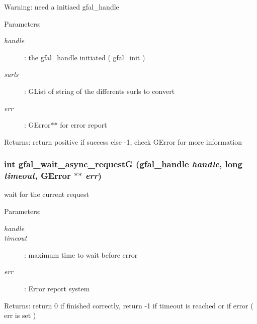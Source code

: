 \begin{Desc}
\item[Warning:]need a initiaed gfal\_\-handle \end{Desc}
\begin{Desc}
\item[Parameters:]
\begin{description}
\item[{\em handle}]: the gfal\_\-handle initiated ( gfal\_\-init ) \item[{\em surls}]: GList of string of the differents surls to convert \item[{\em err}]: GError$\ast$$\ast$ for error report \end{description}
\end{Desc}
\begin{Desc}
\item[Returns:]return positive if success else -1, check GError for more information \end{Desc}
\subsubsection{\setlength{\rightskip}{0pt plus 5cm}int gfal\_\-wait\_\-async\_\-request\-G (gfal\_\-handle {\em handle}, long {\em timeout}, GError $\ast$$\ast$ {\em err})}\label{gfal__common__srm_8h_86890a00f72d9af9ab88f42a69e3bf8c}


wait for the current request 

\begin{Desc}
\item[Parameters:]
\begin{description}
\item[{\em handle}]\item[{\em timeout}]: maximum time to wait before error \item[{\em err}]: Error report system \end{description}
\end{Desc}
\begin{Desc}
\item[Returns:]return 0 if finished correctly, return -1 if timeout is reached or if error ( err is set ) \end{Desc}
